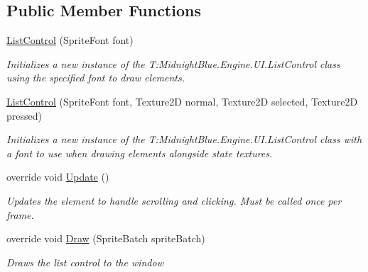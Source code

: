 \subsection*{Public Member Functions}
\begin{DoxyCompactItemize}
\item 
\hyperlink{class_midnight_blue_1_1_engine_1_1_u_i_1_1_list_control_ac75da180d7693f41f97e88e9f37bf1bd}{List\+Control} (Sprite\+Font font)
\begin{DoxyCompactList}\small\item\em Initializes a new instance of the T\+:\+Midnight\+Blue.\+Engine.\+U\+I.\+List\+Control class using the specified font to draw elements. \end{DoxyCompactList}\item 
\hyperlink{class_midnight_blue_1_1_engine_1_1_u_i_1_1_list_control_a361177221501c8fc694a0f31e9236377}{List\+Control} (Sprite\+Font font, Texture2D normal, Texture2D selected, Texture2D pressed)
\begin{DoxyCompactList}\small\item\em Initializes a new instance of the T\+:\+Midnight\+Blue.\+Engine.\+U\+I.\+List\+Control class with a font to use when drawing elements alongside state textures. \end{DoxyCompactList}\item 
override void \hyperlink{class_midnight_blue_1_1_engine_1_1_u_i_1_1_list_control_a062289ffbf721905fb4f8aabadbef5fc}{Update} ()
\begin{DoxyCompactList}\small\item\em Updates the element to handle scrolling and clicking. Must be called once per frame. \end{DoxyCompactList}\item 
override void \hyperlink{class_midnight_blue_1_1_engine_1_1_u_i_1_1_list_control_a2f1c5c5f59bfc8c1850d8f3d29334781}{Draw} (Sprite\+Batch sprite\+Batch)
\begin{DoxyCompactList}\small\item\em Draws the list control to the window \end{DoxyCompactList}\end{DoxyCompactItemize}
